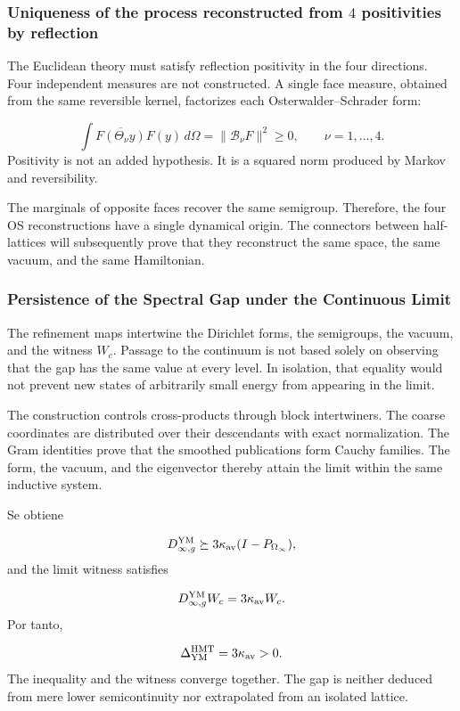\subsubsection{Uniqueness of the process reconstructed from \(4\) positivities by reflection}
The Euclidean theory must satisfy reflection positivity in the four directions. Four independent measures are not constructed. A single face measure, obtained from the same reversible kernel, factorizes each Osterwalder–Schrader form:\par
\[
\int
\overline{F(\Theta_{\nu}y)}F(y)\,d\Omega
=
\|\mathcal B_\nu F\|^2
\ge0,
\qquad \nu=1,\ldots,4.
\]
Positivity is not an added hypothesis. It is a squared norm produced by Markov and reversibility.\par
The marginals of opposite faces recover the same semigroup. Therefore, the four OS reconstructions have a single dynamical origin. The connectors between half-lattices will subsequently prove that they reconstruct the same space, the same vacuum, and the same Hamiltonian.\par
{}
\subsubsection{Persistence of the Spectral Gap under the Continuous Limit}
The refinement maps intertwine the Dirichlet forms, the semigroups, the vacuum, and the witness \(W_c\). Passage to the continuum is not based solely on observing that the gap has the same value at every level. In isolation, that equality would not prevent new states of arbitrarily small energy from appearing in the limit.\par
The construction controls cross-products through block intertwiners. The coarse coordinates are distributed over their descendants with exact normalization. The Gram identities prove that the smoothed publications form Cauchy families. The form, the vacuum, and the eigenvector thereby attain the limit within the same inductive system.\par
Se obtiene\par
\[
D_{\infty,g}^{\rm YM}
\succeq
3\kappa_{\rm av}(I-P_{\Omega_\infty}),
\]
and the limit witness satisfies\par
\[
D_{\infty,g}^{\rm YM}W_c
=
3\kappa_{\rm av}W_c.
\]
Por tanto,\par
\[
\Delta_{\rm YM}^{\rm HMT}
=
3\kappa_{\rm av}>0.
\]
The inequality and the witness converge together. The gap is neither deduced from mere lower semicontinuity nor extrapolated from an isolated lattice.\par
{}
